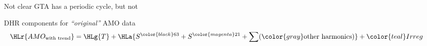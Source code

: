 \begin{slide}
  \begin{block}{Not clear}
    GTA has a periodic cycle, but not \AMO
    \begin{center}
    \end{center}
  \end{block}
\end{slide}

\begin{slide}
  \begin{block}{DHR components for \emph{``original''} AMO data}
    \centering
  \begin{displaymath}
    \HLr{AMO_{\text{with trend}}}=\HLg{T}+\HLa{S^{\color{black}63}+S^{\color{magenta}21}+\sum ({\color{gray}\text{other harmonics}})}+{\color{teal}Irreg}
  \end{displaymath}
  \end{block}
\end{slide}

